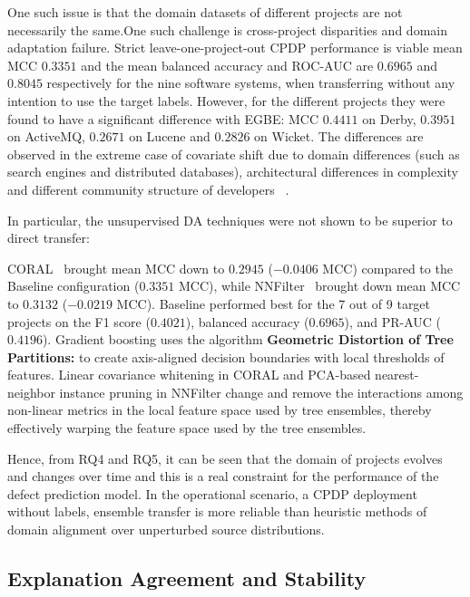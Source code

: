 \documentclass[conference]{IEEEtran}
\begin{document}
One such issue is that the domain datasets of different projects are not necessarily the same.One such challenge is cross-project disparities and domain adaptation failure.
Strict leave-one-project-out CPDP performance is viable mean MCC $0.3351$ and the mean balanced accuracy and ROC-AUC are $0.6965$ and $0.8045$ respectively for the nine software systems, when transferring without any intention to use the target labels. However, for the different projects they were found to have a significant difference with EGBE: MCC $0.4411$ on Derby, $0.3951$ on ActiveMQ, $0.2671$ on Lucene and $0.2826$ on Wicket. The differences are observed in the extreme case of covariate shift due to domain differences (such as search engines and distributed databases), architectural differences in complexity and different community structure of developers ~\cite{sottomayor2024survey, turhan2009crosscompany}.

In particular, the unsupervised DA techniques were not shown to be superior to direct transfer:
\begin{enumerate}
    CORAL~\cite{sun2016coral} brought mean MCC down to $0.2945$ ($-0.0406$ MCC) compared to the Baseline configuration ($0.3351$ MCC), while NNFilter~\cite{turhan2009crosscompany} brought down mean MCC to $0.3132$ ($-0.0219$ MCC). Baseline performed best for the 7 out of 9 target projects on the F1 score ($0.4021$), balanced accuracy ($0.6965$), and PR-AUC ($0.4196$).
    Gradient boosting uses the algorithm \textbf{Geometric Distortion of Tree Partitions:} to create axis-aligned decision boundaries with local thresholds of features. Linear covariance whitening in CORAL and PCA-based nearest-neighbor instance pruning in NNFilter change and remove the interactions among non-linear metrics in the local feature space used by tree ensembles, thereby effectively warping the feature space used by the tree ensembles.
\end{enumerate}
Hence, from RQ4 and RQ5, it can be seen that the domain of projects evolves and changes over time and this is a real constraint for the performance of the defect prediction model. In the operational scenario, a CPDP deployment without labels, ensemble transfer is more reliable than heuristic methods of domain alignment over unperturbed source distributions.

\subsection{Explanation Agreement and Stability}
\label{subsec:explanation-agreement-and-stability}
\end{document}
